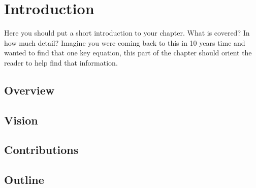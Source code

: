 \chapter{Introduction}
Here you should put a short introduction to your chapter. What is covered? In how much detail? Imagine you were coming back to this in 10 years time and wanted to find that one key equation, this part of the chapter should orient the reader to help find that information.

\section{Overview} \label{sec:overview}

\section{Vision}

\section{Contributions}

\section{Outline}
